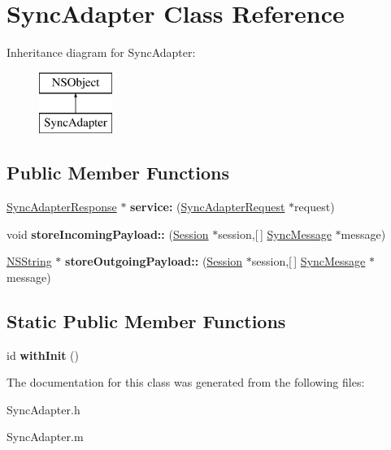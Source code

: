 \hypertarget{interface_sync_adapter}{
\section{\-Sync\-Adapter \-Class \-Reference}
\label{interface_sync_adapter}
}
\-Inheritance diagram for \-Sync\-Adapter\-:\begin{figure}[H]
\begin{center}
\leavevmode
\includegraphics[height=2.000000cm]{interface_sync_adapter}
\end{center}
\end{figure}
\subsection*{\-Public \-Member \-Functions}
\begin{DoxyCompactItemize}
\item 
\hypertarget{interface_sync_adapter_a502a43e85f1178785f97ab6d54995693}{
\hyperlink{interface_sync_adapter_response}{\-Sync\-Adapter\-Response} $\ast$ {\bfseries service\-:} (\hyperlink{interface_sync_adapter_request}{\-Sync\-Adapter\-Request} $\ast$request)}
\label{interface_sync_adapter_a502a43e85f1178785f97ab6d54995693}

\item 
\hypertarget{interface_sync_adapter_a8d77a46eed01fdbb148dc3fe0abc6fb1}{
void {\bfseries store\-Incoming\-Payload\-::} (\hyperlink{interface_session}{\-Session} $\ast$session,\mbox{[}$\,$\mbox{]} \hyperlink{interface_sync_message}{\-Sync\-Message} $\ast$message)}
\label{interface_sync_adapter_a8d77a46eed01fdbb148dc3fe0abc6fb1}

\item 
\hypertarget{interface_sync_adapter_ac0998e6ce8d081b6ef9be093e3433b2a}{
\hyperlink{class_n_s_string}{\-N\-S\-String} $\ast$ {\bfseries store\-Outgoing\-Payload\-::} (\hyperlink{interface_session}{\-Session} $\ast$session,\mbox{[}$\,$\mbox{]} \hyperlink{interface_sync_message}{\-Sync\-Message} $\ast$message)}
\label{interface_sync_adapter_ac0998e6ce8d081b6ef9be093e3433b2a}

\end{DoxyCompactItemize}
\subsection*{\-Static \-Public \-Member \-Functions}
\begin{DoxyCompactItemize}
\item 
\hypertarget{interface_sync_adapter_acd5a71ae6a4c01c61692189f1ee9a50b}{
id {\bfseries with\-Init} ()}
\label{interface_sync_adapter_acd5a71ae6a4c01c61692189f1ee9a50b}

\end{DoxyCompactItemize}


\-The documentation for this class was generated from the following files\-:\begin{DoxyCompactItemize}
\item 
\-Sync\-Adapter.\-h\item 
\-Sync\-Adapter.\-m\end{DoxyCompactItemize}
